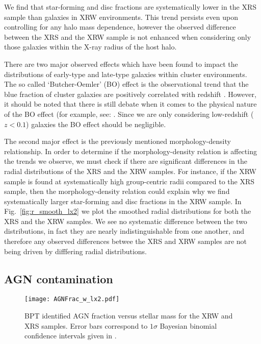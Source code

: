 We find that star-forming and disc fractions are systematically lower
in the XRS sample than galaxies in XRW environments.  This trend
persists even upon controlling for any halo mass dependence, however
the observed difference between the XRS and the XRW sample is not
enhanced when considering only those galaxies within the X-ray radius
of the host halo.
\par
There are two major observed effects which have been found to impact
the distributions of early-type and late-type galaxies within cluster
environments.  The so called `Butcher-Oemler' (BO) effect is the
observational trend that the blue fraction of cluster galaxies are
positively correlated with redshift \citep[e.g.][]{butcher1984,
  ellingson2001, loh2008, urquhart2010}.  However, it should be noted
that there is still debate when it comes to the physical nature of the
BO effect (for example, see: \citealt{andreon1999, andreon2004,
  andreon2006}.  Since we are only considering low-redshift ($z <
0.1$) galaxies the BO effect should be negligible.
\par
The second major effect is the previously mentioned morphology-density
relationship.  In order to determine if the morphology-density
relation is affecting the trends we observe, we must check if there
are significant differences in the radial distributions of the XRS and
the XRW samples.  For instance, if the XRW sample is found at
systematically high group-centric radii compared to the XRS sample,
then the morphology-density relation could explain why we find
systematically larger star-forming and disc fractions in the XRW
sample.  In Fig.~\ref{fig:r_smooth_lx2} we plot the smoothed radial
distributions for both the XRS and the XRW samples.  We see no
systematic difference between the two distributions, in fact they are
nearly indistinguishable from one another, and therefore any observed
differences betwee the XRS and XRW samples are not being driven by
difffering radial distributions.

\subsection{AGN contamination}

\begin{figure}[!tp]
  \centering
  \texttt{[image: AGNFrac\_w\_lx2.pdf]}
  \caption[AGN fraction versus stellar mass for the XRW and XRS
    samples]{BPT identified AGN fraction versus stellar mass for the
    XRW 
  and XRS samples.  Error bars correspond to $1\sigma$ Bayesian
  binomial confidence intervals given in \citet{cameron2011}.}
  \label{fig:AGNFrac_w_lx2}
\end{figure}

